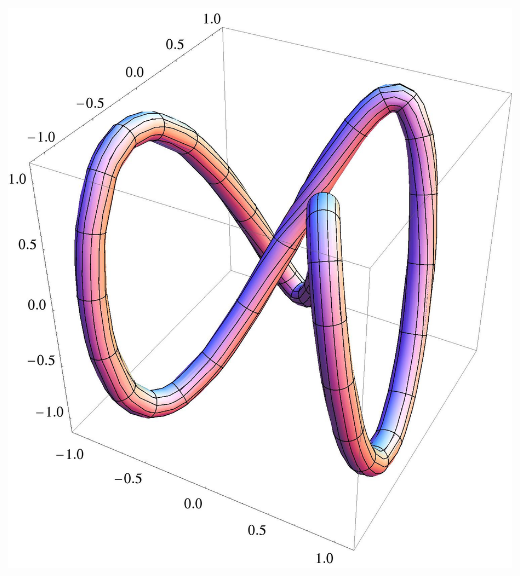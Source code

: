 \documentclass{ximera}
\begin{document}
\begin{image}
  \includegraphics{tube.jpg}
\end{image}
\end{document}
